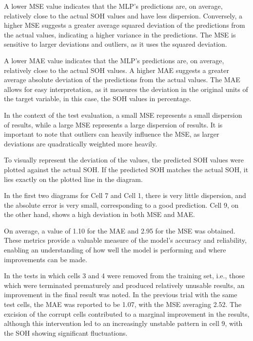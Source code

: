 \documentclass[energies,article,accept,pdftex,moreauthors]{Definitions/mdpi}
\begin{document}
A lower MSE value indicates that the MLP's predictions are, on average, relatively close to the actual SOH values and have less dispersion. Conversely, a higher MSE suggests a greater average squared deviation of the predictions from the actual values, indicating a higher variance in the predictions. The MSE is sensitive to larger deviations and outliers, as it uses the squared deviation.

A lower MAE value indicates that the MLP's predictions are, on average, relatively close to the actual SOH values. A higher MAE suggests a greater average absolute deviation of the predictions from the actual values. The MAE allows for easy interpretation, as it measures the deviation in the original units of the target variable, in this case, the SOH values in percentage.

In the context of the test evaluation, a small MSE represents a small dispersion of results, while a large MSE represents a large dispersion of results. It is important to note that outliers can heavily influence the MSE, as larger deviations are quadratically weighted more heavily.

To visually represent the deviation of the values, the predicted SOH values were plotted against the actual SOH. If the predicted SOH matches the actual SOH, it lies exactly on the plotted line in the diagram.

In the first two diagrams for Cell 7 and Cell 1, there is very little dispersion, and the absolute error is very small, corresponding to a good prediction. Cell 9, on the other hand, shows a high deviation in both MSE and MAE.
    


On average, a value of 1.10 for the MAE and 2.95 for the MSE was obtained. These metrics provide a valuable measure of the model's accuracy and reliability, enabling an understanding of how well the model is performing and where improvements can be made.

In the tests in which cells 3 and 4 were removed from the training set, i.e., those which were terminated prematurely and produced relatively unusable results, an improvement in the final result was noted. In the previous trial with the same test cells, the MAE was reported to be 1.07, with the MSE averaging 2.52. The excision of the corrupt cells contributed to a marginal improvement in the results, although this intervention led to an increasingly unstable pattern in cell 9, with the SOH showing significant fluctuations.
\end{document}

